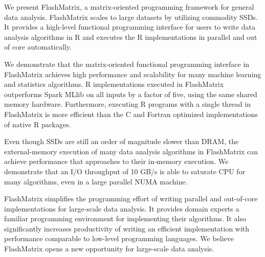 We present FlashMatrix, a matrix-oriented programming framework for general
data analysis. FlashMatrix scales to large datasets by utilizing commodity SSDs.
It provides a high-level functional programming interface for users to write
data analysis algorithms in R and
executes the R implementations in parallel and out of core automatically.

We demonstrate that the matrix-oriented functional programming interface in
FlashMatrix achieves high performance and scalability for many machine learning and 
statistics algorithms.  R implementations executed in FlashMatrix outperforms
Spark MLlib on all inputs by a factor of five, using the same shared memory hardware.
Furthermore, executing R programs with a single thread in FlashMatrix is more
efficient than the C and Fortran optimized implementations of native R packages.


Even though SSDs are still an order of magnitude slower than DRAM, the external-memory
execution of many data analysis algorithms in FlashMatrix can achieve performance
that approaches to their in-memory execution. We demonstrate that an I/O throughput
of 10 GB/s is able to saturate CPU for many algorithms, even in a large parallel
NUMA machine. 

FlashMatrix simplifies the programming effort of writing
parallel and out-of-core implementations for large-scale data analysis. It
provides domain experts a familiar programming environment for implementing
their algorithms. It also significantly
increases productivity of writing an efficient implementation with performance
comparable to low-level programming languages. We believe FlashMatrix opens
a new opportunity for large-scale data analysis.
